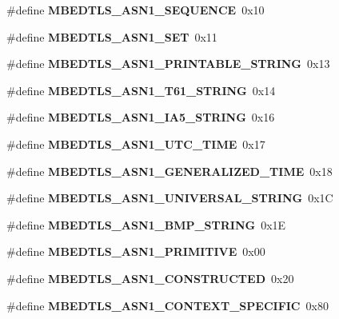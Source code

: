 \begin{DoxyCompactItemize}
\#define {\bfseries M\+B\+E\+D\+T\+L\+S\+\_\+\+A\+S\+N1\+\_\+\+S\+E\+Q\+U\+E\+N\+CE}~0x10
\item 
\mbox{\label{group__asn1__module_ga67afaa83253889dacb9fcb47062162c5}} 
\#define {\bfseries M\+B\+E\+D\+T\+L\+S\+\_\+\+A\+S\+N1\+\_\+\+S\+ET}~0x11
\item 
\mbox{\label{group__asn1__module_ga57f497984e573597e1ed100afcc3f965}} 
\#define {\bfseries M\+B\+E\+D\+T\+L\+S\+\_\+\+A\+S\+N1\+\_\+\+P\+R\+I\+N\+T\+A\+B\+L\+E\+\_\+\+S\+T\+R\+I\+NG}~0x13
\item 
\mbox{\label{group__asn1__module_gabe4ca1599521c0a3b4c54391906c2083}} 
\#define {\bfseries M\+B\+E\+D\+T\+L\+S\+\_\+\+A\+S\+N1\+\_\+\+T61\+\_\+\+S\+T\+R\+I\+NG}~0x14
\item 
\mbox{\label{group__asn1__module_ga30d5d0f805af50deb5820e741a53e481}} 
\#define {\bfseries M\+B\+E\+D\+T\+L\+S\+\_\+\+A\+S\+N1\+\_\+\+I\+A5\+\_\+\+S\+T\+R\+I\+NG}~0x16
\item 
\mbox{\label{group__asn1__module_gac4e932ef9cdf9fa9b8fb152357c6ec64}} 
\#define {\bfseries M\+B\+E\+D\+T\+L\+S\+\_\+\+A\+S\+N1\+\_\+\+U\+T\+C\+\_\+\+T\+I\+ME}~0x17
\item 
\mbox{\label{group__asn1__module_ga29f746333b11a4d9e0b7624dcd982fdb}} 
\#define {\bfseries M\+B\+E\+D\+T\+L\+S\+\_\+\+A\+S\+N1\+\_\+\+G\+E\+N\+E\+R\+A\+L\+I\+Z\+E\+D\+\_\+\+T\+I\+ME}~0x18
\item 
\mbox{\label{group__asn1__module_gacdbc7c6bcf1b8eb158a52ed773f3cdf3}} 
\#define {\bfseries M\+B\+E\+D\+T\+L\+S\+\_\+\+A\+S\+N1\+\_\+\+U\+N\+I\+V\+E\+R\+S\+A\+L\+\_\+\+S\+T\+R\+I\+NG}~0x1C
\item 
\mbox{\label{group__asn1__module_ga577f12d1a059eb52928614c50f2bb0d8}} 
\#define {\bfseries M\+B\+E\+D\+T\+L\+S\+\_\+\+A\+S\+N1\+\_\+\+B\+M\+P\+\_\+\+S\+T\+R\+I\+NG}~0x1E
\item 
\mbox{\label{group__asn1__module_ga800aec91d6d124d917bb2707b246c551}} 
\#define {\bfseries M\+B\+E\+D\+T\+L\+S\+\_\+\+A\+S\+N1\+\_\+\+P\+R\+I\+M\+I\+T\+I\+VE}~0x00
\item 
\mbox{\label{group__asn1__module_ga8d855bf93e7f26e7c0c9c70af7f04d8e}} 
\#define {\bfseries M\+B\+E\+D\+T\+L\+S\+\_\+\+A\+S\+N1\+\_\+\+C\+O\+N\+S\+T\+R\+U\+C\+T\+ED}~0x20
\item 
\mbox{\label{group__asn1__module_ga8d78fbb123ee982c80d8020050bf86e0}} 
\#define {\bfseries M\+B\+E\+D\+T\+L\+S\+\_\+\+A\+S\+N1\+\_\+\+C\+O\+N\+T\+E\+X\+T\+\_\+\+S\+P\+E\+C\+I\+F\+IC}~0x80
\end{DoxyCompactItemize}


